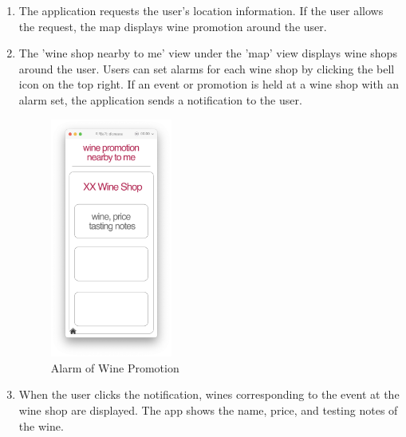 \documentclass[conference]{IEEEtran}
\numberwithin{figure}{subsection}
\begin{document}
\begin{enumerate}
\begin{enumerate}
\begin{enumerate}
\begin{enumerate}
\begin{figure}[htb!]
                \end{figure}
                \item The application requests the user's location information. If the user allows the request, the map displays wine promotion around the user. 
                \item The 'wine shop nearby to me' view under the 'map' view displays wine shops around the user. Users can set alarms for each wine shop by clicking the bell icon on the top right. If an event or promotion is held at a wine shop with an alarm set, the application sends a notification to the user. 
                \begin{figure}[htb!]
                    \centerline{\includegraphics[width=4cm]{winepromoalarm.png}}
                    \caption{Alarm of Wine Promotion}
                \end{figure}
                \item When the user clicks the notification, wines corresponding to the event at the wine shop are displayed. The app shows the name, price, and testing notes of the wine.
            \end{enumerate}
            

\end{enumerate}
\end{enumerate}
\end{enumerate}
\end{document}
